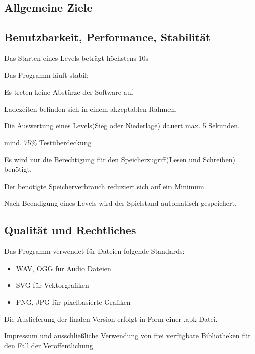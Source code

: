 \documentclass{scrartcl}
\begin{document}
\subsection{Allgemeine Ziele}

\begin{nflist}
    \item
\end{nflist}

\subsection{Benutzbarkeit, Performance, Stabilität}
\begin{nflist}[resume]
	\item Das Starten eines Levels beträgt höchstens 10s 
	\item Das Programm läuft stabil: 
	\begin{nflist}
		\item Es treten keine Abstürze der Software auf 
		\item Ladezeiten befinden sich in einem akzeptablen Rahmen. 
	\end{nflist}
	\item Die Auswertung eines Levels(Sieg oder Niederlage) dauert max. 5 Sekunden. 
	\item mind. 75\% Testüberdeckung 
	\item Es wird nur die Berechtigung für den Speicherzugriff(Lesen
	und Schreiben) benötigt. 
	\item Der benötigte Speicherverbrauch reduziert sich auf ein Minimum. 
	\item Nach Beendigung eines Levels wird der Spielstand automatisch gespeichert.
\end{nflist}

\subsection{Qualität und Rechtliches}

\begin{nflist}[resume]
	\item Das Programm verwendet für Dateien folgende Standards: 
	\begin{itemize}
		\item WAV, OGG für Audio Dateien 
		\item SVG für Vektorgrafiken 
		\item PNG, JPG für pixelbasierte Grafiken 
	\end{itemize}
	\item Die Auslieferung der finalen Version erfolgt in Form einer .apk-Datei.
	\item Impressum und ausschließliche Verwendung von frei verfügbare Bibliotheken
	für den Fall der Veröffentlichung
\end{nflist}
\end{document}
